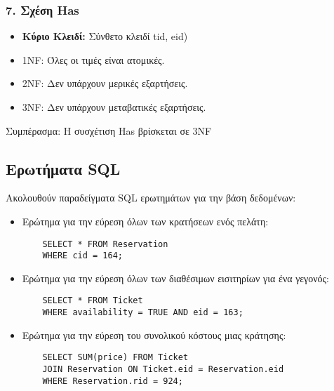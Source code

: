 \documentclass[a4paper, 11pt]{article}
\begin{document}
\subsubsection*{7. Σχέση Has}
\begin{itemize}
    \item \textbf{Κύριο Κλειδί:} Σύνθετο κλειδί tid, eid)
    \item 1NF: Όλες οι τιμές είναι ατομικές.
    \item 2NF: Δεν υπάρχουν μερικές εξαρτήσεις.
    \item 3NF: Δεν υπάρχουν μεταβατικές εξαρτήσεις.
\end{itemize}
Συμπέρασμα: Η συσχέτιση Has βρίσκεται σε 3NF
\subsection*{Ερωτήματα SQL}
Ακολουθούν παραδείγματα SQL ερωτημάτων για την βάση δεδομένων:
\begin{itemize}
    \item Ερώτημα για την εύρεση όλων των κρατήσεων ενός πελάτη:
    \begin{verbatim}
    SELECT * FROM Reservation
    WHERE cid = 164; 
    \end{verbatim}
    \item Ερώτημα για την εύρεση όλων των διαθέσιμων εισιτηρίων για ένα γεγονός:
    \begin{verbatim}
    SELECT * FROM Ticket
    WHERE availability = TRUE AND eid = 163;
    \end{verbatim}
    \item Ερώτημα για την εύρεση του συνολικού κόστους μιας κράτησης:
    \begin{verbatim}
    SELECT SUM(price) FROM Ticket
    JOIN Reservation ON Ticket.eid = Reservation.eid
    WHERE Reservation.rid = 924;
    \end{verbatim}
\end{itemize}
\end{document}
